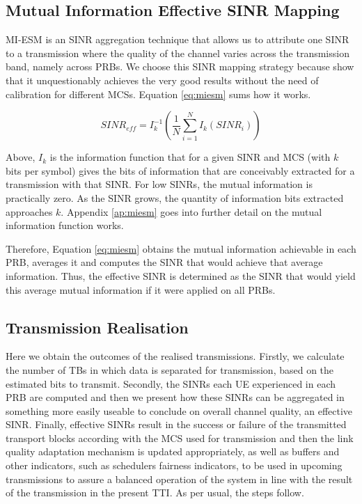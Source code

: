 \subsection*{Mutual Information Effective SINR Mapping}
\label{sec:miesm}

\acs{MI-ESM} is an SINR aggregation technique that allows us to attribute one SINR to a transmission where the quality of the channel varies across the transmission band, namely across PRBs. We choose this SINR mapping strategy because \cite{1656798, 4657235, 5982870, 6008103, miesm1} show that it unquestionably achieves the very good results without the need of calibration for different MCSs. Equation \eqref{eq:miesm} sums how it works.

\begin{equation} \label{eq:miesm}
    SINR_{eff} = I_k^{-1} \left( \frac{1}{N} \sum_{i=1}^N I_k\left(SINR_i\right)\right)
\end{equation}

Above, $I_k$ is the information function that for a given SINR and MCS (with $k$ bits per symbol) gives the bits of information that are conceivably extracted for a transmission with that SINR. For low SINRs, the mutual information is practically zero. As the SINR grows, the quantity of information bits extracted approaches $k$. Appendix \ref{ap:miesm} goes into further detail on the mutual information function works.  

Therefore, Equation \eqref{eq:miesm} obtains the mutual information achievable in each PRB, averages it and computes the SINR that would achieve that average information. Thus, the effective SINR is determined as the SINR that would yield this average mutual information if it were applied on all PRBs. 


\subsection{Transmission Realisation}

Here we obtain the outcomes of the realised transmissions. Firstly, we calculate the number of TBs in which data is separated for transmission, based on the estimated bits to transmit. Secondly, the SINRs each UE experienced in each PRB are computed and then we present how these SINRs can be aggregated in something more easily useable to conclude on overall channel quality, an effective SINR. Finally, effective SINRs result in the success or failure of the transmitted transport blocks according with the MCS used for transmission and then the link quality adaptation mechanism is updated appropriately, as well as buffers and other indicators, such as schedulers fairness indicators, to be used in upcoming transmissions to assure a balanced operation of the system in line with the result of the transmission in the present TTI. As per usual, the steps follow.


